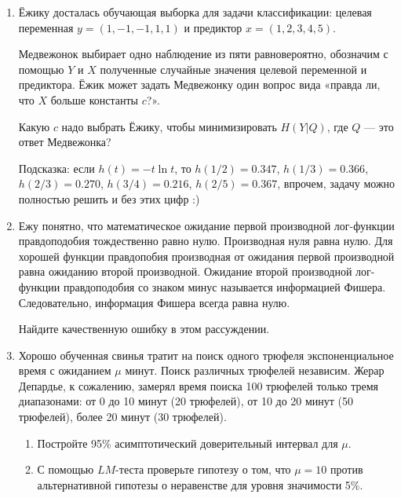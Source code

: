 \documentclass[12pt]{article}
\begin{document}

\begin{enumerate}

\item Ёжику досталась обучающая выборка для задачи классификации: \newline
целевая переменная $y=(1, -1, -1, 1, 1)$ и предиктор $x=(1, 2, 3, 4, 5)$.

Медвежонок выбирает одно наблюдение из пяти равновероятно, обозначим с помощью $Y$ и $X$ 
полученные случайные значения целевой переменной и предиктора. 
Ёжик может задать Медвежонку один вопрос вида «правда ли, что $X$ больше константы $c$?».

Какую $c$ надо выбрать Ёжику, чтобы минимизировать $H(Y|Q)$, где $Q$ — это ответ Медвежонка? 


Подсказка: если $h(t) = -t\ln t$, то $h(1/2)=0.347$, $h(1/3)=0.366$, $h(2/3)=0.270$, $h(3/4)=0.216$, $h(2/5)=0.367$,
впрочем, задачу можно полностью решить и без этих цифр :)



\item Ежу понятно, что математическое ожидание первой производной лог-функции правдоподобия тождественно равно нулю.
Производная нуля равна нулю. Для хорошей функции правдопобия производная от ожидания первой производной равна ожиданию второй производной. 
Ожидание второй производной лог-функции правдоподобия со знаком минус называется информацией Фишера. 
Следовательно, информация Фишера всегда равна нулю. 

Найдите качественную ошибку в этом рассуждении. 



\item Хорошо обученная свинья тратит на поиск одного трюфеля экспоненциальное время с ожиданием $\mu$ минут. 
Поиск различных трюфелей независим. 
Жерар Депардье, к сожалению, замерял время поиска 100 трюфелей только тремя диапазонами: 
от 0 до 10 минут (20 трюфелей), от 10 до 20 минут (50 трюфелей), более 20 минут (30 трюфелей). 

\begin{enumerate}
    \item Постройте 95\% асимптотический доверительный интервал для $\mu$. 
    \item С помощью $LM$-теста проверьте гипотезу о том, что $\mu = 10$ против альтернативной 
    гипотезы о неравенстве для уровня значимости 5\%.
\end{enumerate}


\end{enumerate}
\end{document}
